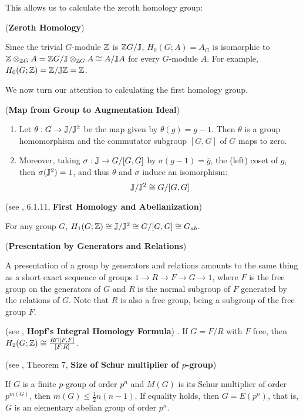 This allows us to calculate the zeroth homology group:

\begin{example} (\textbf{Zeroth Homology})

Since the trivial $G$-module $\mathbb Z$ is $\mathbb Z G / \mathbb J$, $H_0(G;A) = A_G$ is isomorphic to $\mathbb Z \otimes_{\mathbb Z G} A = \mathbb Z G / \mathbb J \otimes_{\mathbb Z G} A \cong A/ \mathbb J A$ for every $G$-module $A$. For example, $H_0(G;\mathbb Z) = \mathbb Z / \mathbb J \mathbb Z= \mathbb Z$. 

\end{example}

We now turn our attention to calculating the first homology group.

\begin{proposition}(\textbf{Map from Group to Augmentation Ideal})
\begin{enumerate}
\item Let $\theta: G \rightarrow \mathbb J / \mathbb J^2$ be the map given by $\theta (g) = g-1$. Then $\theta$ is a group homomorphism and the commutator subgroup $[G,G]$ of $G$ maps to zero.

\item Moreover, taking $\sigma: \mathbb J \rightarrow G/ [G,G]$ by $\sigma (g-1) = \bar g$, the (left) coset of $g$, then $\sigma(\mathbb J^2) = 1$, and thus $\theta$ and $\sigma$ induce an isomorphism:
$$\mathbb J / \mathbb J^2 \cong G/ [G,G]$$
\end{enumerate}
\end{proposition}

\begin{theorem}(see \cite{Weibel}, 6.1.11, \textbf{First Homology and Abelianization})

For any group $G$, $H_1(G;\mathbb Z) \cong \mathbb J / \mathbb J^2 \cong G/[G,G]\cong G_{ab}$.

\end{theorem}

\begin{definition} (\textbf{Presentation by Generators and Relations})

A presentation of a group by generators and relations amounts to the same thing as a short exact sequence of groups $1\rightarrow R \rightarrow F \rightarrow G\rightarrow 1$, where $F$ is the free group on the generators of $G$ and $R$ is the normal subgroup of $F$ generated by the relations of $G$. Note that $R$ is also a free group, being a subgroup of the free group $F$.
\end{definition}

\begin{theorem} (see \cite{hopf}, \textbf{Hopf's Integral Homology Formula})
.
If $G=F/R$ with $F$ free, then $H_2(G;\mathbb Z) \cong \frac {R\cap [F,F]} {[F,R]}$.
\end{theorem}



\begin{theorem} (see \cite{Schur}, Theorem 7, \textbf{Size of Schur multiplier of $p$-group})

If $G$ is a finite $p$-group of order $p^n$ and $M(G)$ is its Schur multiplier of order $p^{m(G)}$, then $m(G) \leq \frac{1}{2} n (n-1).$ If equality holds, then $G= E(p^n)$, that is, $G$ is an elementary abelian group of order $p^n$.
\end{theorem}


